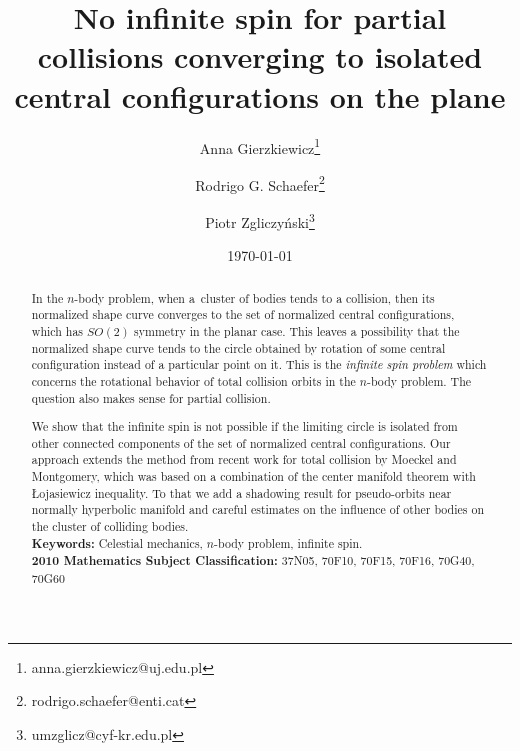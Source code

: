 \documentclass[a4paper,10pt]{article}
\title{No infinite spin for partial collisions converging to isolated central configurations on the plane}
\author[1]{Anna Gierzkiewicz\thanks{anna.gierzkiewicz@uj.edu.pl}}
\author[2]{Rodrigo G. Schaefer\thanks{rodrigo.schaefer@enti.cat}}
\author[1]{Piotr Zgliczy\'nski\thanks{umzglicz@cyf-kr.edu.pl}}
\affil[1]{Jagiellonian University,
ul. \L ojasiewicza 6, 30-348 Krak\'ow, Poland}
\affil[2]{Escola de Noves Tecnologies Interactives (ENTI-UB), Carrer de Baldiri Reixac, 7, 08028, Barcelona}
\date{%
    \today
}
\theoremstyle{definition}
\begin{document}
\maketitle

\begin{abstract}
In the $n$-body problem, when a~cluster of bodies tends to a collision, then its normalized shape curve converges to the set of normalized central configurations, which has $SO(2)$
symmetry in the planar case. This leaves a possibility that the normalized  shape curve  tends to the circle obtained by rotation of some central configuration instead of a particular point on it. This is the \emph{infinite spin problem} which concerns the rotational behavior of total collision orbits in the $n$-body problem. The question also makes sense for  partial collision.

We show that the infinite spin is not possible if the limiting circle is isolated from other connected components of the set of normalized central configurations. Our approach extends the method from recent work for total collision by Moeckel and Montgomery, which was based on a combination of the center manifold theorem with {\L}ojasiewicz inequality. To that we add a shadowing result for pseudo-orbits near normally hyperbolic manifold and careful estimates on the influence of other bodies
on the cluster of colliding bodies.
\\[2mm]
\textbf{Keywords:} Celestial mechanics, $n$-body problem, infinite spin.
\\[2mm]
\textbf{2010 Mathematics Subject Classification:} 37N05, 70F10, 70F15, 70F16, 70G40, 70G60
\end{abstract}












\end{document}
